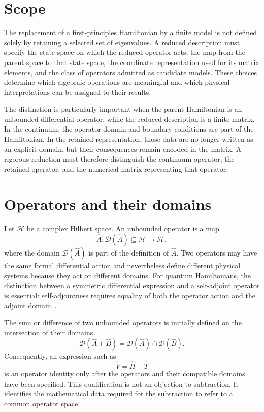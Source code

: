 
\section*{Scope}

The replacement of a first-principles Hamiltonian by a finite model is not
defined solely by retaining a selected set of eigenvalues. A reduced
description must specify the state space on which the reduced operator acts,
the map from the parent space to that state space, the coordinate
representation used for its matrix elements, and the class of operators
admitted as candidate models. These choices determine which algebraic
operations are meaningful and which physical interpretations can be assigned
to their results.

The distinction is particularly important when the parent Hamiltonian is an
unbounded differential operator, while the reduced description is a finite
matrix. In the continuum, the operator domain and boundary conditions are part
of the Hamiltonian. In the retained representation, those data are no longer
written as an explicit domain, but their consequences remain encoded in the
matrix. A rigorous reduction must therefore distinguish the continuum
operator, the retained operator, and the numerical matrix representing that
operator.

\section*{Operators and their domains}

Let $\mathcal H$ be a complex Hilbert space. An unbounded operator is a map
\begin{equation}
    \hat A:
    \mathcal D(\hat A)\subseteq\mathcal H
    \longrightarrow
    \mathcal H,
\end{equation}
where the domain $\mathcal D(\hat A)$ is part of the definition of $\hat A$.
Two operators may have the same formal differential action and nevertheless
define different physical systems because they act on different domains. For
quantum Hamiltonians, the distinction between a symmetric differential
expression and a self-adjoint operator is essential: self-adjointness requires
equality of both the operator action and the adjoint domain~\cite{teschl2014,reedSimon1975,schmudgen2012}.

The sum or difference of two unbounded operators is initially defined on the
intersection of their domains,
\begin{equation}
    \mathcal D(\hat A\pm\hat B)
    =
    \mathcal D(\hat A)\cap\mathcal D(\hat B).
\end{equation}
Consequently, an expression such as
\begin{equation}
    \hat V=\hat H-\hat T
\end{equation}
is an operator identity only after the operators and their compatible domains
have been specified. This qualification is not an objection to subtraction.
It identifies the mathematical data required for the subtraction to refer to
a common operator space.

